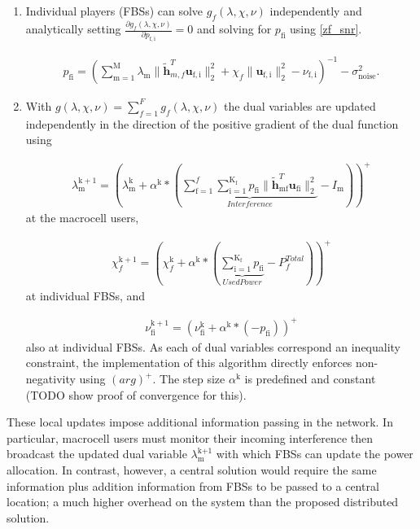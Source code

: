\documentclass[12pt,a4paper]{report}
\begin{document}
\begin{enumerate}
\item 
Individual players (FBSs) can solve $ g_f(\lambda, \chi, \nu) $ independently and analytically setting $\frac{\partial g_f(\lambda, \chi, \nu)}{\partial p_{\mathrm{f,i}}} = 0$ 
and solving for $p_{\mathrm{fi}}$ using \eqref{zf_snr}.

\begin{gather}
p_{\mathrm{fi}} = (\sum_{\mathrm{m=1}}^{\mathrm{M}}\lambda_{\mathrm{m}}\|\mathbf{\tilde{h}}_{m,f}^T \mathbf{u}_{\mathrm{f,i}}\|^2_2
+\chi_{f} \|\mathbf{u}_{\mathrm{f,i}}\|^2_2
-\nu_{\mathrm{f,i}}
 )^{-1}
  - \sigma^2_{\text{noise}}.
\end{gather}

\item 
With $g(\lambda, \chi, \nu) = \sum_{f=1}^{F}g_f(\lambda, \chi, \nu)$ the dual variables are updated independently in the direction of the positive gradient of the dual function using

\begin{gather}
\lambda_{\mathrm{m}}^{\mathrm{k+1}} = (
\lambda_{\mathrm{m}}^{\mathrm{k}}
+
\alpha^{\mathrm{k}}*
(
\underbrace{
\sum _{\mathrm{f=1}}^{f}
\sum _{\mathrm{i=1}}^{\mathrm{K_{f}}}
p_{\mathrm{fi}}
\|\mathbf{\tilde{h}}_{\mathrm{mf}}^T \mathbf{u_{\mathrm{fi}}}\|^2_2}_{Interference}
- I_{\mathrm{m}}
))^+
\end{gather}
 at the macrocell users,

\begin{gather}
\chi_{f}^{\mathrm{k+1}} = (
\chi_{f}^{\mathrm{k}}
+
\alpha^{\mathrm{k}}*
(\underbrace{\sum_{\mathrm{i=1}}^{\mathrm{K_{f}}} p_{\mathrm{fi}}}_{Used Power} - P_{f}^{Total}) )^+
\end{gather}
 at individual FBSs, and 

\begin{gather}
\nu_{\mathrm{fi}}^{\mathrm{k+1}} = (
\nu_{\mathrm{fi}}^{\mathrm{k}}
+
\alpha^{\mathrm{k}}*
(-p_{\mathrm{fi}}))^+
\end{gather}
also at individual FBSs.
As each of dual variables correspond an inequality constraint, the implementation of this algorithm directly enforces non-negativity using 
$(arg)^+$.
The step size $\alpha^{\mathrm{k}}$ is predefined and constant (TODO show proof of convergence for this).



\end{enumerate} 
These local updates impose additional information passing in the network. In particular, macrocell users must monitor their incoming interference then broadcast the updated dual variable $\lambda_{\text{m}}^{\text{k+1}}$ with which FBSs can update the power allocation. In contrast, however, a central solution would require the same information plus addition information from FBSs to be passed to a central location; a much higher overhead on the system than the proposed distributed solution. 
\end{document}
